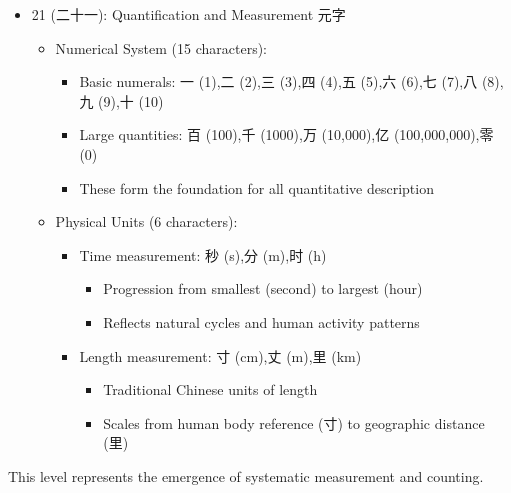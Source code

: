 \begin{itemize}
\tightlist
\item
  21 (二十一): Quantification and Measurement 元字

  \begin{itemize}
  \tightlist
  \item
    Numerical System (15 characters):

    \begin{itemize}
    \tightlist
    \item
      Basic numerals: 一 (1),二 (2),三 (3),四 (4),五 (5),六 (6),七
      (7),八 (8),九 (9),十 (10)
    \item
      Large quantities: 百 (100),千 (1000),万 (10,000),亿
      (100,000,000),零 (0)
    \item
      These form the foundation for all quantitative description
    \end{itemize}
  \item
    Physical Units (6 characters):

    \begin{itemize}
    \tightlist
    \item
      Time measurement: 秒 (s),分 (m),时 (h)

      \begin{itemize}
      \tightlist
      \item
        Progression from smallest (second) to largest (hour)
      \item
        Reflects natural cycles and human activity patterns
      \end{itemize}
    \item
      Length measurement: 寸 (cm),丈 (m),里 (km)

      \begin{itemize}
      \tightlist
      \item
        Traditional Chinese units of length
      \item
        Scales from human body reference (寸) to geographic distance
        (里)
      \end{itemize}
    \end{itemize}
  \end{itemize}
\end{itemize}

This level represents the emergence of systematic measurement and
counting.

